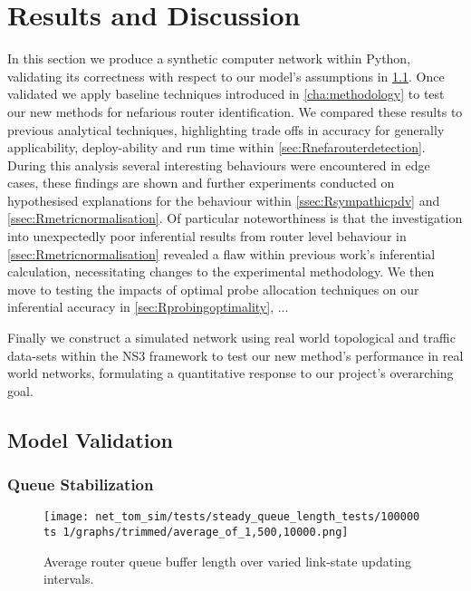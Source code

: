 \chapter{Results and Discussion}
\label{cha:result}
In this section we produce a synthetic computer network within Python, validating its correctness with respect to our model's assumptions in \cref{sec:Rmodelvalidation}. Once validated we apply baseline techniques introduced in \cref{cha:methodology} to test our new methods for nefarious router identification. We compared these results to previous analytical techniques, highlighting trade offs in accuracy for generally applicability, deploy-ability and run time within \cref{sec:Rnefarouterdetection}. During this analysis several interesting behaviours were encountered in edge cases, these findings are shown and further experiments conducted on hypothesised explanations for the behaviour within \cref{ssec:Rsympathicpdv} and \cref{ssec:Rmetricnormalisation}. Of particular noteworthiness is that the investigation into unexpectedly poor inferential results from router level \pdv  behaviour in \cref{ssec:Rmetricnormalisation} revealed a flaw within previous work's inferential calculation, necessitating changes to the experimental methodology. We then move to testing the impacts of optimal probe allocation techniques on our inferential accuracy in \cref{sec:Rprobingoptimality}, ...\par
{}
Finally we construct a simulated network using real world topological and traffic data-sets within the NS3 framework to test our new method's performance in real world networks, formulating a quantitative response to our project's overarching goal.

\section{Model Validation}
\label{sec:Rmodelvalidation}

\subsection{Queue Stabilization}
\label{ssec:Rqueuestabilization}
\begin{figure}[H]
    \centering
    \texttt{[image: net\_tom\_sim/tests/steady\_queue\_length\_tests/100000 ts 1/graphs/trimmed/average\_of\_1,500,10000.png]}
    \caption{Average router queue buffer length over varied link-state updating intervals.}
    \label{fig:Ravgq}
\end{figure}

